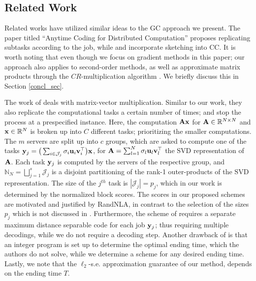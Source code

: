 \documentclass[journal,letterpaper,onecolumn,twoside,nofonttune]{IEEEtran}
\newcommand{\N}{\mathbb{N}}
\newcommand{\R}{\mathbb{R}}
\newcommand{\J}{\mathcal{J}}
\newcommand{\ub}{\bold{u}}
\newcommand{\vb}{\bold{v}}
\newcommand{\xb}{\bold{x}}
\newcommand{\yb}{\bold{y}}
\newcommand{\Ab}{\bold{A}}
\newcommand{\SVD}{\mathrm{SVD}}
\begin{document}
\subsection{Related Work}
\label{rel_work_subs}

Related works \cite{FD16,JM19,GWCR18,GKCMR20} have utilized similar ideas to the GC approach we present. The paper titled ``Anytime Coding for Distributed Computation'' \cite{FD16} proposes replicating subtasks according to the job, while \cite{GKCMR20} and \cite{JM19} incorporate sketching into CC. It is worth noting that even though we focus on gradient methods in this paper; our approach also applies to second-order methods, as well as approximate matrix products through the $CR$-multiplication algorithm \cite{DK01,DFKVV99,CPH20c}. We briefly discuss this in Section \ref{concl_sec}.%

The work of \cite{FD16} deals with matrix-vector multiplication. Similar to our work, they also replicate the computational tasks a certain number of times; and stop the process at a prespecified instance. Here, the computation $\Ab\xb$ for $\Ab\in\R^{N\times N}$ and $\xb\in\R^N$ is broken up into $C$ different tasks; prioritizing the smaller computations. The $m$ servers are split up into $c$ groups, which are asked to compute one of the tasks $\yb_j=\big(\sum_{i\in\J_j}\sigma_i\ub_i\vb_i^\top\big)\xb$, for $\Ab=\sum_{l=1}^N\sigma_l\ub_l\vb_l^\top$ the $\SVD$ representation of $\Ab$. Each task $\yb_j$ is computed by the servers of the respective group, and $\N_N=\bigsqcup_{j=1}^s\J_j$ is a disjoint partitioning of the rank-1 outer-products of the $\SVD$ representation. The size of the $j^{th}$ task is $|\J_j|=p_j$, which in our work is determined by the normalized block scores. The scores in our proposed schemes are motivated and justified by RandNLA, in contrast to the selection of the sizes $p_j$ which is not discussed in \cite{FD16}. Furthermore, the scheme of \cite{FD16} requires a separate maximum distance separable code for each job $\yb_j$; thus requiring multiple decodings, while we do not require a decoding step. Another drawback of \cite{FD16} is that an integer program is set up to determine the optimal ending time, which the authors do not solve, while we determine a scheme for any desired ending time. Lastly, we note that the $\ell_2$-s.e. approximation guarantee of our method, depends on the ending time $T$.
\end{document}
